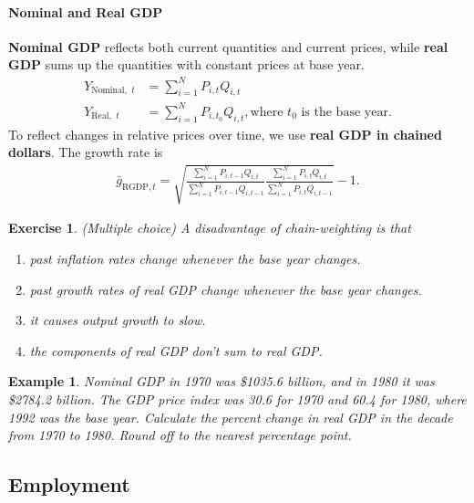 \documentclass[12pt]{article}
\newtheorem{example}{Example}
\newtheorem{exercise}{Exercise}
\numberwithin{equation}{section}
\begin{document}
\paragraph{Nominal and Real GDP}
\textbf{Nominal GDP} reflects both current quantities and current prices, while \textbf{real GDP} sums up the quantities with constant prices at base year. 
\begin{align*}
    Y_{\text{Nominal, }\, t} &= \sum^N_{i=1} P_{i,t}Q_{i,t}\\
    Y_{\text{Real, }\, t} &= \sum^N_{i=1} P_{i,t_0}Q_{i,t}, \text{where } t_0 \text{ is the base year.}
\end{align*}
To reflect changes in relative prices over time, we use \textbf{real GDP in chained dollars}. The growth rate is
\begin{align*}
    \bar{g}_{\text{RGDP}, t} = \sqrt{\frac{\sum^N_{i=1} P_{i,t-1}Q_{i,t}}{\sum^N_{i=1} P_{i,t-1}Q_{i,t-1}} \frac{\sum^N_{i=1} P_{i,t}Q_{i,t}}{\sum^N_{i=1} P_{i,t}Q_{i,t-1}}}-1.
\end{align*}
\begin{exercise}
    (Multiple choice) A disadvantage of chain-weighting is that
    \begin{enumerate}[label=\Alph*.]
        \item past inflation rates change whenever the base year changes.
        \item past growth rates of real GDP change whenever the base year changes.
        \item it causes output growth to slow.
        \item the components of real GDP don't sum to real GDP.
    \end{enumerate}
\end{exercise}


\begin{example}
    Nominal GDP in 1970 was \$1035.6 billion, and in 1980 it was \$2784.2 billion. The GDP price index was 30.6 for 1970 and 60.4 for 1980, where 1992 was the base year. Calculate the percent change in real GDP in the decade from 1970 to 1980. Round off to the nearest percentage point.
\end{example}

\vspace{36pt}

\subsection*{Employment}
\end{document}
